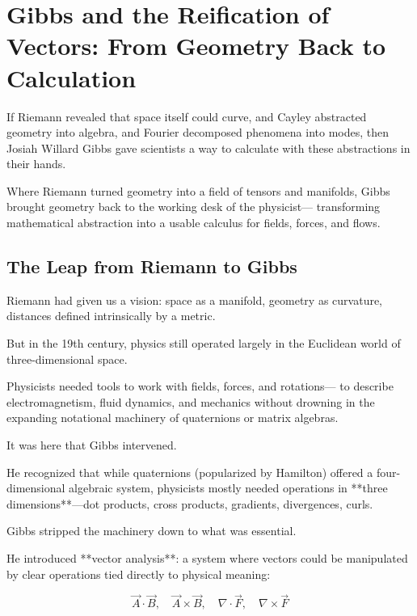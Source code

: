 \section{Gibbs and the Reification of Vectors: From Geometry Back to Calculation}

If Riemann revealed that space itself could curve,  
and Cayley abstracted geometry into algebra,  
and Fourier decomposed phenomena into modes,  
then Josiah Willard Gibbs gave scientists a way to calculate with these abstractions in their hands.

Where Riemann turned geometry into a field of tensors and manifolds,  
Gibbs brought geometry back to the working desk of the physicist—  
transforming mathematical abstraction into a usable calculus for fields, forces, and flows.

\bigskip

\subsection*{The Leap from Riemann to Gibbs}

Riemann had given us a vision: space as a manifold, geometry as curvature, distances defined intrinsically by a metric.

But in the 19th century, physics still operated largely in the Euclidean world of three-dimensional space.

Physicists needed tools to work with fields, forces, and rotations—  
to describe electromagnetism, fluid dynamics, and mechanics without drowning in the expanding notational machinery of quaternions or matrix algebras.

It was here that Gibbs intervened.

He recognized that while quaternions (popularized by Hamilton) offered a four-dimensional algebraic system,  
physicists mostly needed operations in **three dimensions**—dot products, cross products, gradients, divergences, curls.

Gibbs stripped the machinery down to what was essential.

He introduced **vector analysis**: a system where vectors could be manipulated by clear operations tied directly to physical meaning:

\[
\vec{A} \cdot \vec{B}, \quad \vec{A} \times \vec{B}, \quad \nabla \cdot \vec{F}, \quad \nabla \times \vec{F}
\]

\bigskip

